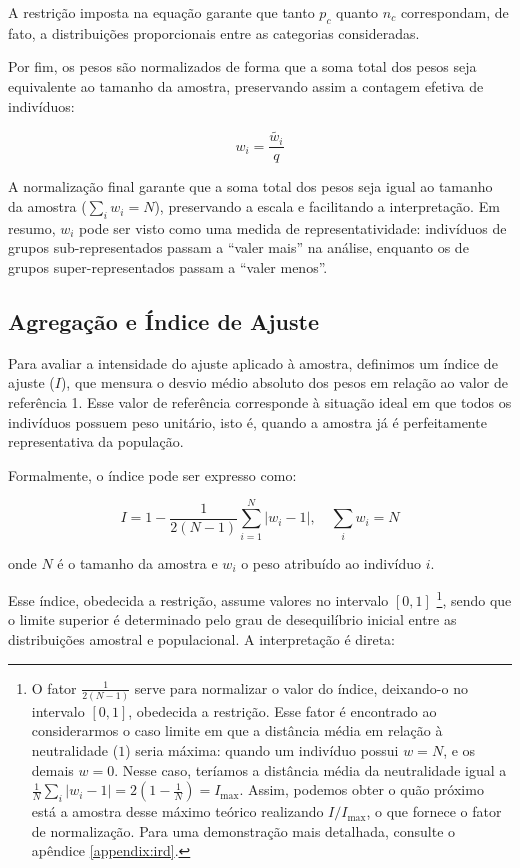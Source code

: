 A restrição imposta na equação garante que tanto $p_c$ quanto $n_c$ correspondam, de fato, a distribuições proporcionais entre as categorias consideradas.

Por fim, os pesos são normalizados de forma que a soma total dos pesos seja equivalente ao tamanho da amostra, preservando assim a contagem efetiva de indivíduos:

\begin{equation}
w_i = \frac{\widetilde{w_i}}{q}
\end{equation}

A normalização final garante que a soma total dos pesos seja igual ao tamanho da amostra ($\sum_i w_i = N$), preservando a escala e facilitando a interpretação. Em resumo, $w_i$ pode ser visto como uma medida de representatividade: indivíduos de grupos sub-representados passam a ``valer mais'' na análise, enquanto os de grupos super-representados passam a ``valer menos''.


\subsection*{Agregação e Índice de Ajuste}
Para avaliar a intensidade do ajuste aplicado à amostra, definimos um índice de ajuste ($I$), que mensura o desvio médio absoluto dos pesos em relação ao valor de referência 1. Esse valor de referência corresponde à situação ideal em que todos os indivíduos possuem peso unitário, isto é, quando a amostra já é perfeitamente representativa da população.

Formalmente, o índice pode ser expresso como:

\begin{equation}
I = 1 - \frac{1}{2(N-1)} \sum_{i=1}^{N} |w_i - 1|, \quad \sum_i w_i = N
\end{equation}

onde $N$ é o tamanho da amostra e $w_i$ o peso atribuído ao indivíduo $i$.

Esse índice, obedecida a restrição, assume valores no intervalo $[0,1]$ \footnote{O fator $\tfrac{1}{2(N-1)}$ serve para normalizar o valor do índice, deixando-o no intervalo $[0,1]$, obedecida a restrição. 
Esse fator é encontrado ao considerarmos o caso limite em que a distância média em relação à neutralidade ($1$) seria máxima: quando um indivíduo possui $w = N$, e os demais $w = 0$. 
Nesse caso, teríamos a distância média da neutralidade igual a $\frac{1}{N} \sum_{i} |w_i - 1| = 2 \left(1 - \tfrac{1}{N}\right) = I_{\max}$. 
Assim, podemos obter o quão próximo está a amostra desse máximo teórico realizando $I/I_{\max}$, o que fornece o fator de normalização. Para uma demonstração mais detalhada, consulte o apêndice \ref{appendix:ird}.}, sendo que o limite superior é determinado pelo grau de desequilíbrio inicial entre as distribuições amostral e populacional. A interpretação é direta:

